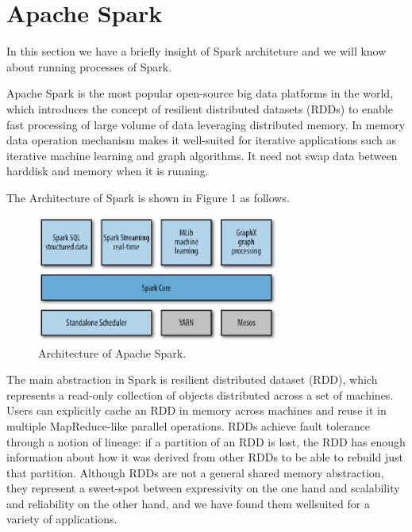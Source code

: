 \section{Apache Spark}\label{sec:definition}
\par In this section we have a briefly insight of Spark architeture and we will know about running processes of Spark.
\par  Apache Spark \cite{apachespark} is the most popular open-source big data platforms in the world, which introduces the concept of resilient distributed datasets (RDDs) \cite{apachespark} to enable fast processing of large volume of data leveraging distributed memory. In memory data operation mechanism makes it well-suited for iterative applications such as iterative machine learning and graph algorithms. It need not swap data between harddisk and memory when it is running.
\par The Architecture of Spark is shown in Figure 1 as follows.
\begin{figure}[h]
	\includegraphics[width=8cm]{1.eps}
	\caption{Architecture of Apache Spark.}\label{fig:ArchitectureSpark}
\end{figure}
\par The main abstraction in Spark is resilient distributed dataset (RDD), which represents a read-only collection of objects distributed across a set of machines. Users can explicitly cache an RDD in memory across machines and reuse it in multiple MapReduce-like parallel operations. RDDs achieve fault tolerance through a notion of lineage: if a partition of an RDD is lost, the RDD has enough information about how it was derived from other RDDs to be able to rebuild just that partition. Although RDDs are not a general shared memory abstraction, they represent a sweet-spot between expressivity on the one hand and scalability and reliability on the other hand, and we have found them wellsuited for a variety of applications. 


